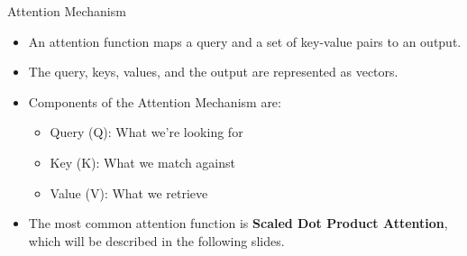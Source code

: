 \documentclass[serif, aspectratio=169]{beamer}
\begin{document}
\begin{frame}{Attention Mechanism}
	\begin{itemize}
		\item An attention function maps a query and a set of key-value pairs to an output.
		\item The query, keys, values, and the output are represented as vectors.
		\item Components of the Attention Mechanism are:
		    \begin{itemize}
			\item Query (Q): What we're looking for
			\item Key (K): What we match against
			\item Value (V): What we retrieve
			\end{itemize}
		\item The most common attention function is \textbf{Scaled Dot Product Attention}, which will be described in the following slides.
	\end{itemize}
\end{frame}
\end{document}

